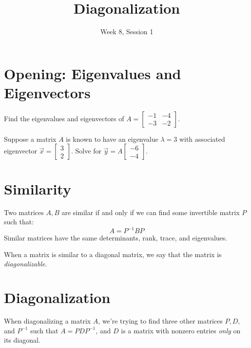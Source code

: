 \documentclass[11pt]{exam}
\title{Diagonalization}
\date{Week 8, Session 1}
\begin{document}
\maketitle

\section{Opening: Eigenvalues and Eigenvectors}
\vspace{20px}
    \begin{questions}
        \item Find the eigenvalues and eigenvectors of $A = \begin{bmatrix} -1 & -4 \\ -3 & -2 \end{bmatrix}$.
        \item Suppose a matrix $A$ is known to have an eigenvalue $\lambda = 3$
        with associated eigenvector $\vec{x} = \begin{bmatrix} 3 \\ 2 \end{bmatrix}$.
        Solve for $\vec{y} = A\begin{bmatrix} -6 \\ -4 \end{bmatrix}$.
    \end{questions}

\pagebreak
\section{Similarity}
    \vspace{20px}
    Two matrices $A,B$ are similar if and only if we can find some invertible matrix $P$ such that:
    $$A = P^{-1}BP$$
    Similar matrices have the same determinants, rank, trace, and eigenvalues.

    When a matrix is similar to a diagonal matrix, we say that the matrix is \textit{diagonalizable}.

\vspace{50px}
\section{Diagonalization}
    \vspace{20px}
    When diagonalizing a matrix $A$, we're trying to find three other matrices $P, D,$ and $P^{-1}$ such that $A = PDP^{-1}$, and $D$ is a matrix
    with nonzero entries \textit{only} on its diagonal.
\end{document}
